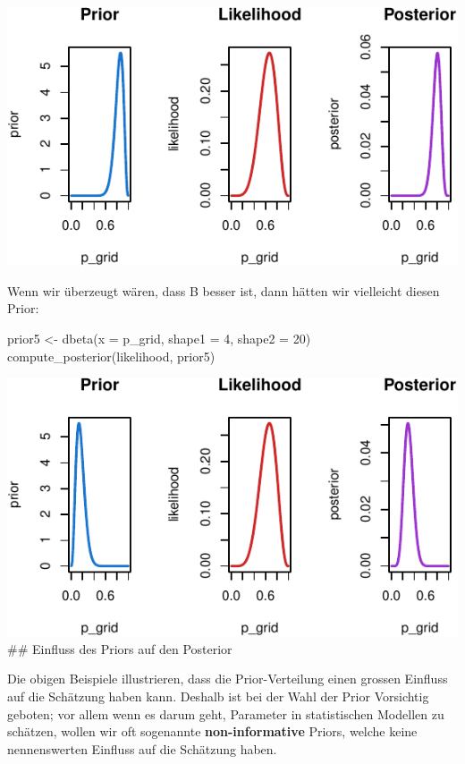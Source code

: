 \documentclass[]{tufte-handout}
\newenvironment{Shaded}{}{}
\newcommand{\AttributeTok}[1]{\textcolor[rgb]{0.49,0.56,0.16}{#1}}
\newcommand{\DecValTok}[1]{\textcolor[rgb]{0.25,0.63,0.44}{#1}}
\newcommand{\FunctionTok}[1]{\textcolor[rgb]{0.02,0.16,0.49}{#1}}
\newcommand{\NormalTok}[1]{#1}
\newcommand{\OtherTok}[1]{\textcolor[rgb]{0.00,0.44,0.13}{#1}}
\begin{document}
\includegraphics{01-intro-bayesian-stats_files/figure-latex/unnamed-chunk-21-1}

Wenn wir überzeugt wären, dass B besser ist, dann hätten wir vielleicht
diesen Prior:

\begin{Shaded}
\begin{Highlighting}[]
\NormalTok{prior5 }\OtherTok{\textless{}{-}} \FunctionTok{dbeta}\NormalTok{(}\AttributeTok{x =}\NormalTok{ p\_grid, }\AttributeTok{shape1 =} \DecValTok{4}\NormalTok{, }\AttributeTok{shape2 =} \DecValTok{20}\NormalTok{)}
\FunctionTok{compute\_posterior}\NormalTok{(likelihood, prior5)}
\end{Highlighting}
\end{Shaded}

\includegraphics{01-intro-bayesian-stats_files/figure-latex/unnamed-chunk-22-1}
\#\# Einfluss des Priors auf den Posterior

Die obigen Beispiele illustrieren, dass die Prior-Verteilung einen
grossen Einfluss auf die Schätzung haben kann. Deshalb ist bei der Wahl
der Prior Vorsichtig geboten; vor allem wenn es darum geht, Parameter in
statistischen Modellen zu schätzen, wollen wir oft sogenannte
\textbf{non-informative} Priors, welche keine nennenswerten Einfluss auf
die Schätzung haben.
\end{document}
